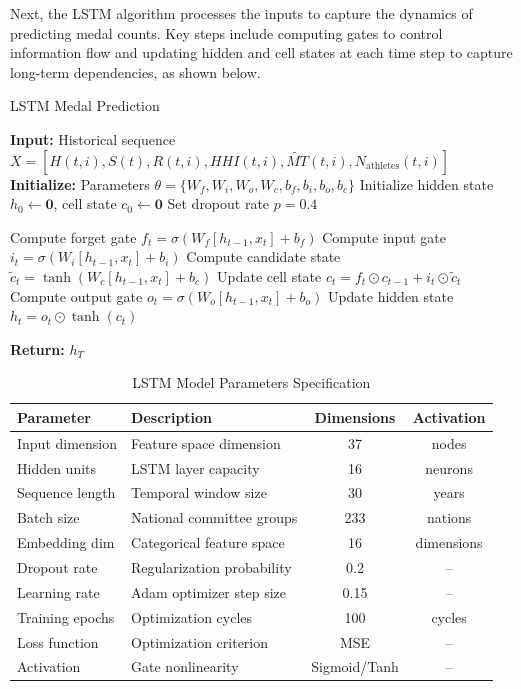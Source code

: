 \documentclass{mcmthesis}
\renewcommand{\arraystretch}{1.2}
\begin{document}
Next, the LSTM algorithm processes the inputs to capture the dynamics of predicting medal counts. Key steps include computing gates to control information flow and updating hidden and cell states at each time step to capture long-term dependencies, as shown below.
\begin{algorithm}
	\caption{LSTM Medal Prediction}
	\begin{algorithmic}[1]
		\State \textbf{Input:} Historical sequence \( X = [H(t,i), S(t), R(t,i), HHI(t,i), \widetilde{MT}(t,i), N_{\text{athletes}}(t,i)] \)
		\State \textbf{Initialize:} Parameters \( \theta = \{W_f, W_i, W_o, W_c, b_f, b_i, b_o, b_c\} \)
		\State Initialize hidden state \( h_0 \gets \mathbf{0} \), cell state \( c_0 \gets \mathbf{0} \)
		\State Set dropout rate \( p = 0.4 \)
		
		\State Compute forget gate \( f_t = \sigma(W_f[h_{t-1}, x_t] + b_f) \)
		\State Compute input gate \( i_t = \sigma(W_i[h_{t-1}, x_t] + b_i) \)
		\State Compute candidate state \( \tilde{c}_t = \tanh(W_c[h_{t-1}, x_t] + b_c) \)
		\State Update cell state \( c_t = f_t \odot c_{t-1} + i_t \odot \tilde{c}_t \)
		\State Compute output gate \( o_t = \sigma(W_o[h_{t-1}, x_t] + b_o) \)
		\State Update hidden state \( h_t = o_t \odot \tanh(c_t) \)
		\EndFor
		
		\State \textbf{Return:} \( h_T \)
	\end{algorithmic}
\end{algorithm}


\begin{table}[H]
	\centering
	\caption{LSTM Model Parameters Specification}
	\label{tab:lstm_params}
	\renewcommand{\arraystretch}{1}
	\small
	\begin{tabularx}{\textwidth}{lYcc}
		\toprule
		\textbf{Parameter} & \textbf{Description} & \textbf{Dimensions} & \textbf{Activation} \\
		\midrule
		
	Input dimension & Feature space dimension & 37 & nodes \\
	Hidden units & LSTM layer capacity & 16 & neurons \\
	Sequence length & Temporal window size & 30 & years \\
	Batch size & National committee groups & 233 & nations \\
	Embedding dim & Categorical feature space & 16 & dimensions \\
	Dropout rate & Regularization probability & 0.2 & -- \\
	Learning rate & Adam optimizer step size & 0.15 & -- \\
	Training epochs & Optimization cycles & 100 & cycles \\
	Loss function & Optimization criterion & MSE & -- \\
	Activation & Gate nonlinearity & Sigmoid/Tanh & -- \\
	\bottomrule
	\end{tabularx}
\end{table}
\end{document}

